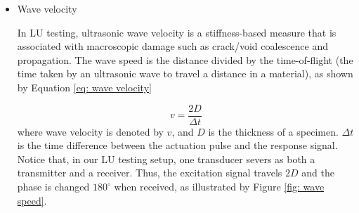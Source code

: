 \begin{itemize}
    \item Wave velocity
    
    In LU testing, ultrasonic wave velocity is a stiffness-based measure that is associated with macroscopic damage such as crack/void coalescence and propagation. The wave speed is the distance divided by the time-of-flight (the time taken by an ultrasonic wave to travel a distance in a material), as shown by Equation \eqref{eq: wave velocity}
    
    \begin{equation}
        v = \frac{2D}{\Delta t}
        \label{eq: wave velocity}
    \end{equation}
    where wave velocity is denoted by $v$, and $D$ is the thickness of a specimen. $\Delta t$ is the time difference between the actuation pulse and the response signal. Notice that, in our LU testing setup, one transducer severs as both a transmitter and a receiver. Thus, the excitation signal travels $2D$ and the phase is changed $180^{\circ} $ when received, as illustrated by Figure \ref{fig: wave speed}.


\end{itemize}

